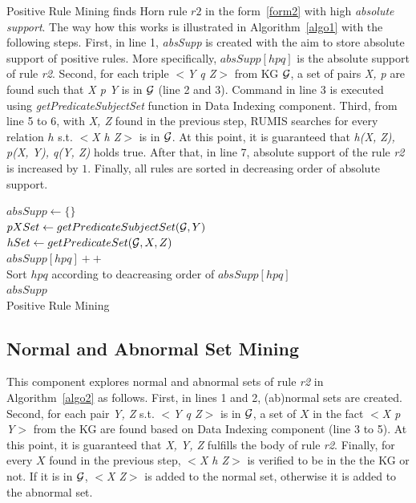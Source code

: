 Positive Rule Mining finds Horn rule $r2$ in the form~\ref{form2} with high \textit{absolute support}. The way how this works is illustrated in Algorithm~\ref{algo1} with the following steps. First, in line 1, \textit{absSupp} is created with the aim to store absolute support of positive rules. More specifically, $absSupp[hpq]$ is the absolute support of rule \textit{r2}. Second, for each triple \textit{$<$Y q Z$>$} from KG $\mathcal{G}$, a set of pairs \textit{X, p} are found such that \textit{X p Y} is in $\mathcal{G}$ (line 2 and 3). Command in line 3 is executed using \textit{getPredicateSubjectSet} function in Data Indexing component. Third, from line 5 to 6, with \textit{X, Z} found in the previous step, RUMIS searches for every relation $h$ s.t. \textit{$<$X h Z$>$} is in $\mathcal{G}$. At this point, it is guaranteed that \textit{h(X, Z), p(X, Y), q(Y, Z)} holds true. After that, in line 7, absolute support of the rule \textit{r2} is increased by $1$. Finally, all rules are sorted in decreasing order of absolute support.

\IncMargin{1.5em}
\begin{algorithm}[H]
\DontPrintSemicolon
\SetAlgoLined
{}
\BlankLine
$absSupp \leftarrow \{\}$\\
\BlankLine
{} {
    \BlankLine
	$pXSet \leftarrow getPredicateSubjectSet(\mathcal{G}, Y)$\\
	 {
		$hSet \leftarrow getPredicateSet(\mathcal{G}, X, Z)$\\
		 {
			$absSupp[hpq]++$\\
		}
	}
}
\BlankLine
Sort $hpq$ according to deacreasing order of $absSupp[hpq]$\\
\Return $absSupp$\\
\caption{Positive Rule Mining}
\label{algo1}
\end{algorithm}
\DecMargin{1.5em}

\subsection{Normal and Abnormal Set Mining}

This component explores normal and abnormal sets of rule \textit{r2} in Algorithm~\ref{algo2} as follows. First, in lines 1 and 2, (ab)normal sets are created. Second, for each pair \textit{Y, Z} s.t. \textit{$<$Y q Z$>$} is in $\mathcal{G}$, a set of $X$ in the fact \textit{$<$X p Y$>$} from the KG are found based on Data Indexing component (line 3 to 5). At this point, it is guaranteed that \textit{X, Y, Z}  fulfills the body of rule \textit{r2}. Finally, for every $X$ found in the previous step, \textit{$<$X h Z$>$} is verified to be in the the KG or not. If it is in $\mathcal{G}$, \textit{$<$X Z$>$} is added to the normal set, otherwise it is added to the abnormal set.

